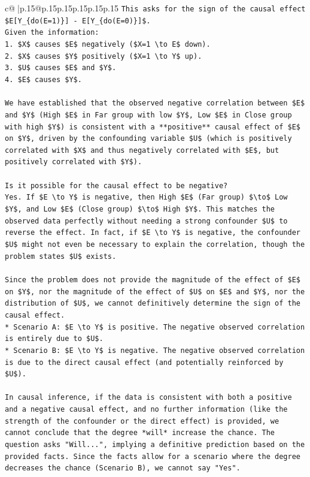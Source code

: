 \documentclass{article}
\begin{document}
{\begin{supertabular}{c@{$\;$}|p{.15\linewidth}@{}p{.15\linewidth}p{.15\linewidth}p{.15\linewidth}p{.15\linewidth}p{.15\linewidth}}
{{{\texttt{This asks for the sign of the causal effect \$E{[}Y\_\{do(E=1)\}{]} {-} E{[}Y\_\{do(E=0)\}{]}\$.} \\
\texttt{Given the information:} \\
\texttt{1.  \$X\$ causes \$E\$ negatively (\$X=1 \textbackslash{}to E\$ down).} \\
\texttt{2.  \$X\$ causes \$Y\$ positively (\$X=1 \textbackslash{}to Y\$ up).} \\
\texttt{3.  \$U\$ causes \$E\$ and \$Y\$.} \\
\texttt{4.  \$E\$ causes \$Y\$.} \\
\\ 
\texttt{We have established that the observed negative correlation between \$E\$ and \$Y\$ (High \$E\$ in Far group with low \$Y\$, Low \$E\$ in Close group with high \$Y\$) is consistent with a **positive** causal effect of \$E\$ on \$Y\$, driven by the confounding variable \$U\$ (which is positively correlated with \$X\$ and thus negatively correlated with \$E\$, but positively correlated with \$Y\$).} \\
\\ 
\texttt{Is it possible for the causal effect to be negative?} \\
\texttt{Yes. If \$E \textbackslash{}to Y\$ is negative, then High \$E\$ (Far group) \$\textbackslash{}to\$ Low \$Y\$, and Low \$E\$ (Close group) \$\textbackslash{}to\$ High \$Y\$. This matches the observed data perfectly without needing a strong confounder \$U\$ to reverse the effect. In fact, if \$E \textbackslash{}to Y\$ is negative, the confounder \$U\$ might not even be necessary to explain the correlation, though the problem states \$U\$ exists.} \\
\\ 
\texttt{Since the problem does not provide the magnitude of the effect of \$E\$ on \$Y\$, nor the magnitude of the effect of \$U\$ on \$E\$ and \$Y\$, nor the distribution of \$U\$, we cannot definitively determine the sign of the causal effect.} \\
\texttt{*   Scenario A: \$E \textbackslash{}to Y\$ is positive. The negative observed correlation is entirely due to \$U\$.} \\
\texttt{*   Scenario B: \$E \textbackslash{}to Y\$ is negative. The negative observed correlation is due to the direct causal effect (and potentially reinforced by \$U\$).} \\
\\ 
\texttt{In causal inference, if the data is consistent with both a positive and a negative causal effect, and no further information (like the strength of the confounder or the direct effect) is provided, we cannot conclude that the degree *will* increase the chance. The question asks "Will...", implying a definitive prediction based on the provided facts. Since the facts allow for a scenario where the degree decreases the chance (Scenario B), we cannot say "Yes".} \\
}}}
\end{supertabular}}
\end{document}
